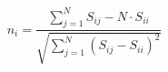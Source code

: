 \begin{equation}
n_i = \frac{\sum\limits_{j=1}^{N} S_{ij} - N\cdot S_{ii}}{\sqrt{\sum\limits_{j=1}^{N} (S_{ij} - S_{ii})^2}}
\end{equation}

